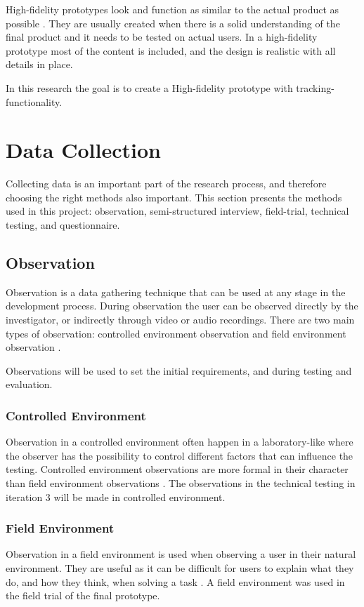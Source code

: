 \documentclass[../Main/thesis.tex]{subfiles}
\begin{document}
High-fidelity prototypes look and function as similar to the actual product as possible \citep{Babich2017}.
They are usually created when there is a solid understanding of the final product and it needs to be tested on actual users.
In a high-fidelity prototype most of the content is included, and the design is realistic with all details in place.

In this research the goal is to create a High-fidelity prototype with tracking-functionality. 

\section{Data Collection}
Collecting data is an important part of the research process, and therefore choosing the right methods also important.
This section presents the methods used in this project: observation, semi-structured interview, field-trial, technical testing, and questionnaire.

\subsection{Observation}
Observation is a data gathering technique that can be used at any stage in the development process.
During observation the user can be observed directly by the investigator, or indirectly through video or audio recordings.
There are two main types of observation: controlled environment observation and field environment observation \citep{Preece2011}.

Observations will be used to set the initial requirements, and during testing and evaluation.

\subsubsection{Controlled Environment}
Observation in a controlled environment often happen in a laboratory-like where the observer has the possibility to control different factors that can influence the testing.
Controlled environment observations are more formal in their character than field environment observations \citep{Preece2011}.
The observations in the technical testing in iteration 3 will be made in controlled environment.

\subsubsection{Field Environment}
Observation in a field environment is used when observing a user in their natural environment.
They are useful as it can be difficult for users to explain what they do, and how they think, when solving a task \citep{Preece2011}.
A field environment was used in the field trial of the final prototype.
\end{document}
